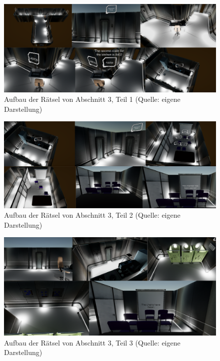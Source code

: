\begin{figure}[ht]
\centering
\includegraphics[width=1\linewidth]{content/pictures/Rätseldesign - Abschnitt02 - Rätsel00.png}
\caption{Aufbau der Rätsel von Abschnitt 3, Teil 1 (Quelle: eigene Darstellung)}
\label{fig:riddle-design-section02-00}
\end{figure}

\begin{figure}[ht]
\centering
\includegraphics[width=1\linewidth]{content/pictures/Rätseldesign - Abschnitt02 - Rätsel01.png}
\caption{Aufbau der Rätsel von Abschnitt 3, Teil 2 (Quelle: eigene Darstellung)}
\label{fig:riddle-design-section02-0l}
\end{figure}

\begin{figure}[ht]
\centering
\includegraphics[width=1\linewidth]{content/pictures/Rätseldesign - Abschnitt02 - Rätsel02.png}
\caption{Aufbau der Rätsel von Abschnitt 3, Teil 3 (Quelle: eigene Darstellung)}
\label{fig:riddle-design-section02-02}
\end{figure}

